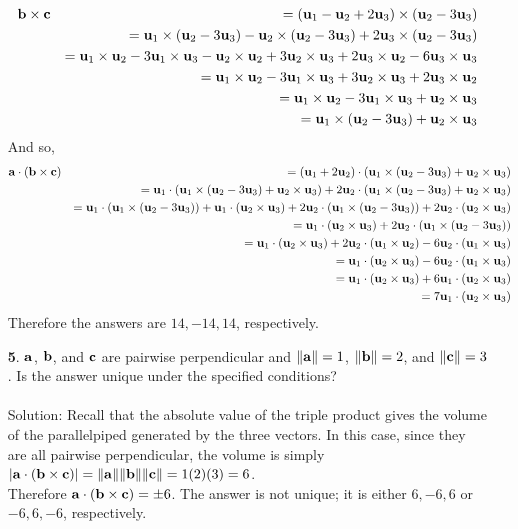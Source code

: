 \documentclass[12pt]{amsbook}
\begin{document}
\begin{enumerate}
\begin{eqnarray*}
{\bf b}\times{\bf c}&&=({\bf u}_1-{\bf u}_2+2{\bf u}_3)\times({\bf u}_2-3{\bf u}_3) \\
&&={\bf u}_1\times({\bf u}_2-3{\bf u}_3)-{\bf u}_2\times({\bf u}_2-3{\bf u}_3)+2{\bf u}_3\times({\bf u}_2-3{\bf u}_3) \\
&&={\bf u}_1\times{\bf u}_2-3{\bf u}_1\times{\bf u}_3-{\bf u}_2\times{\bf u}_2+3{\bf u}_2\times{\bf u}_3+2{\bf u}_3\times{\bf u}_2-6{\bf u}_3\times{\bf u}_3 \\
&&={\bf u}_1\times{\bf u}_2-3{\bf u}_1\times{\bf u}_3+3{\bf u}_2\times{\bf u}_3+2{\bf u}_3\times{\bf u}_2 \\
&&={\bf u}_1\times{\bf u}_2-3{\bf u}_1\times{\bf u}_3+{\bf u}_2\times{\bf u}_3\\
&&={\bf u}_1\times({\bf u}_2-3{\bf u}_3)+{\bf u}_2\times{\bf u}_3
\end{eqnarray*}
And so,
\begin{eqnarray*}
{\bf a}\cdot({\bf b}\times{\bf c})&&=({\bf u}_1+2{\bf u}_2)\cdot({\bf u}_1\times({\bf u}_2-3{\bf u}_3)+{\bf u}_2\times{\bf u}_3)\\
&&={\bf u}_1\cdot({\bf u}_1\times({\bf u}_2-3{\bf u}_3)+{\bf u}_2\times{\bf u}_3)+2{\bf u}_2\cdot({\bf u}_1\times({\bf u}_2-3{\bf u}_3)+{\bf u}_2\times{\bf u}_3)\\
&&={\bf u}_1\cdot({\bf u}_1\times({\bf u}_2-3{\bf u}_3))+{\bf u}_1\cdot({\bf u}_2\times{\bf u}_3)+2{\bf u}_2\cdot({\bf u}_1\times({\bf u}_2-3{\bf u}_3))+2{\bf u}_2\cdot({\bf u}_2\times{\bf u}_3)\\
&&={\bf u}_1\cdot({\bf u}_2\times{\bf u}_3)+2{\bf u}_2\cdot({\bf u}_1\times({\bf u}_2-3{\bf u}_3))\\
&&={\bf u}_1\cdot({\bf u}_2\times{\bf u}_3)+2{\bf u}_2\cdot({\bf u}_1\times{\bf u}_2)-6{\bf u}_2\cdot({\bf u}_1\times{\bf u}_3)\\
&&={\bf u}_1\cdot({\bf u}_2\times{\bf u}_3)-6{\bf u}_2\cdot({\bf u}_1\times{\bf u}_3)\\
&&={\bf u}_1\cdot({\bf u}_2\times{\bf u}_3)+6{\bf u}_1\cdot({\bf u}_2\times{\bf u}_3)\\
&&=7{\bf u}_1\cdot({\bf u}_2\times{\bf u}_3)
\end{eqnarray*}
Therefore the answers are $14,-14,14$, respectively.
\item[{\small\bf 5}.] ${\bf a}$, ${\bf b}$, and ${\bf c}$ are pairwise
perpendicular and $\|{\bf a}\|=1$, $\|{\bf b}\|=2$, and $\|{\bf c}\|=3$. 
Is the answer unique under the specified conditions?\\
\\
{\sc Solution}:
Recall that the absolute value of the triple product gives the volume of the parallelpiped generated by the three vectors. In this case, since they are all pairwise perpendicular, the volume is simply
$|{\bf a}\cdot({\bf b}\times{\bf c})|=\|{\bf a}\|\|{\bf b}\|\|{\bf c}\|=1(2)(3)=6$.
\\
Therefore ${\bf a}\cdot({\bf b}\times{\bf c}) = \pm 6$. The answer is not unique; it is either $6,-6,6$ or $-6,6,-6$, respectively. 
\end{enumerate}
\end{document}
